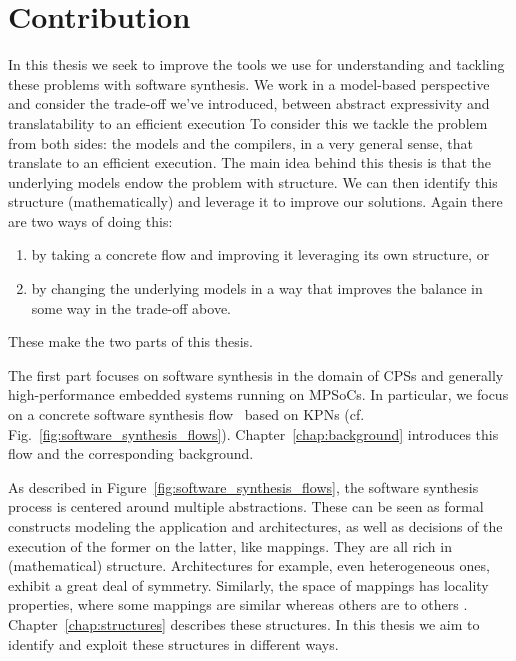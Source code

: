 \section{Contribution}

In this thesis we seek to improve the tools we use for understanding and tackling these problems with software synthesis. 
We work in a model-based perspective and consider the trade-off we've introduced, between abstract expressivity and translatability to an efficient execution
To consider this we tackle the problem from both sides: the models and the compilers, in a very general sense, that translate to an efficient execution.
The main idea behind this thesis is that the underlying models endow the problem with structure.
We can then identify this structure (mathematically) and leverage it to improve our solutions.
Again there are two ways of doing this: 
\begin{enumerate}
\item by taking a concrete flow and improving it leveraging its own structure, or
\item by changing the underlying models in a way that improves the balance in some way in the trade-off above.
\end{enumerate}
These make the two parts of this thesis.

The first part focuses on software synthesis in the domain of \acp{CPS} and generally high-performance embedded systems running on \acp{MPSoC}.
In particular, we focus on a concrete software synthesis flow~\cite{maps,castrillon2014thesis} based on \acp{KPN} (cf. Fig.~\ref{fig:software_synthesis_flows}).
Chapter~\ref{chap:background} introduces this flow and the corresponding background.

As described in Figure~\ref{fig:software_synthesis_flows}, the software synthesis process is centered around multiple abstractions.
These can be seen as formal constructs modeling the application and architectures, as well as decisions of the execution of the former on the latter, like mappings.
They are all rich in (mathematical) structure.
Architectures for example, even heterogeneous ones, exhibit a great deal of symmetry.
Similarly, the space of mappings has locality properties, where some mappings are similar whereas others are to others . Chapter~\ref{chap:structures} describes these structures.
In this thesis we aim to identify and exploit these structures in different ways.

